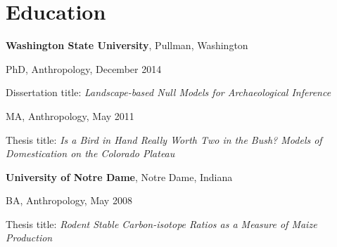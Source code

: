 \section{Education}

{\bf Washington State University}, Pullman, Washington
\begin{list1}
\item[] PhD, Anthropology, December 2014
\begin{list2}
\item[] Dissertation title:  \emph{Landscape-based Null Models for Archaeological Inference}
\end{list2}

\vspace{.1in}

\item[] MA, Anthropology, May 2011
\begin{list2}
\item[] Thesis title:  \emph{Is a Bird in Hand Really Worth Two in the
    Bush? Models of Domestication on the Colorado Plateau}
\end{list2}
\end{list1}


{\bf University of Notre Dame}, Notre Dame, Indiana
\begin{list1}
\item[] BA, Anthropology,  May 2008
\begin{list2}
\item[] Thesis title:  \emph{Rodent Stable Carbon-isotope Ratios as a Measure of Maize Production}
\end{list2}
\end{list1}